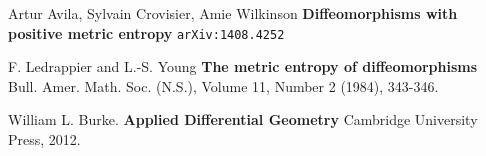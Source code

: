 \documentclass[12pt]{article}
\begin{document}
\begin{thebibliography}{}

\item Artur Avila, Sylvain Crovisier, Amie Wilkinson
\textbf{Diffeomorphisms with positive metric entropy} \texttt{arXiv:1408.4252}

\item F. Ledrappier and L.-S. Young \textbf{The metric entropy of diffeomorphisms} \\ Bull. Amer. Math. Soc. (N.S.), Volume 11, Number 2 (1984), 343-346.

\item William L. Burke.  \textbf{Applied Differential Geometry} Cambridge University Press, 2012.

\end{thebibliography}
\end{document}
